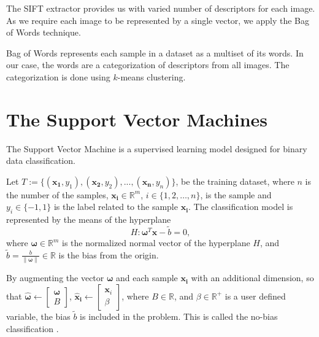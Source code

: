 \documentclass{aip-cp}
\newcommand{\norm}[1]{\left\lVert#1\right\rVert}
\begin{document}
The SIFT extractor provides us with varied number of descriptors for each image. As we require each image to be represented by a single vector, we apply the Bag of Words technique.

Bag of Words represents each sample in a dataset as a multiset of its words. In our case, the words are a categorization of descriptors from all images. The categorization is done using $k$-means clustering.

\section{The Support Vector Machines}
The Support Vector Machine is a supervised learning model designed for binary data classification.

Let \( T := \{(\boldsymbol{x_1}, y_1),(\boldsymbol{x_2}, y_2),...,(\boldsymbol{x_n}, y_n)\} \),
be the training dataset, where $n$ is the number of the samples, \( \boldsymbol{x_i} \in \mathbb{R}^m \), \( i \in \{1,2,\dots,n\} \),
is the sample and \( y_i \in \{-1, 1\} \) is the label related to the sample \( \boldsymbol{x_i} \). The classification model is represented by the means of the hyperplane
\begin{equation}
    H: \boldsymbol{\omega}^T\boldsymbol{x}-\widetilde{b}=0,
    \label{eq:svm:hyperplane}
\end{equation}
where \( \boldsymbol{\omega} \in \mathbb{R}^{m} \) is the normalized normal vector of the hyperplane \( H \), and \( \widetilde{b} = \frac{b}{\norm{\boldsymbol{\omega}}} \in \mathbb{R} \) is the bias from the origin.

By augmenting the vector \(\boldsymbol{\omega}\) and each sample \( \boldsymbol{x_i} \) with an additional dimension, so that \( \boldsymbol{\widehat{\omega}} \leftarrow \begin{bmatrix}\boldsymbol{\omega} \\ B \end{bmatrix}\), \(\boldsymbol{\widehat{x}_i} \leftarrow \begin{bmatrix}\boldsymbol{x}_i \\ \beta \end{bmatrix}\), where \(B \in \mathbb{R}\), and \(\beta \in \mathbb{R}^+\) is a user defined variable, the bias \(\widetilde{b}\) is included in the problem. This is called the no-bias classification \cite{Aeta2018}.
\end{document}
